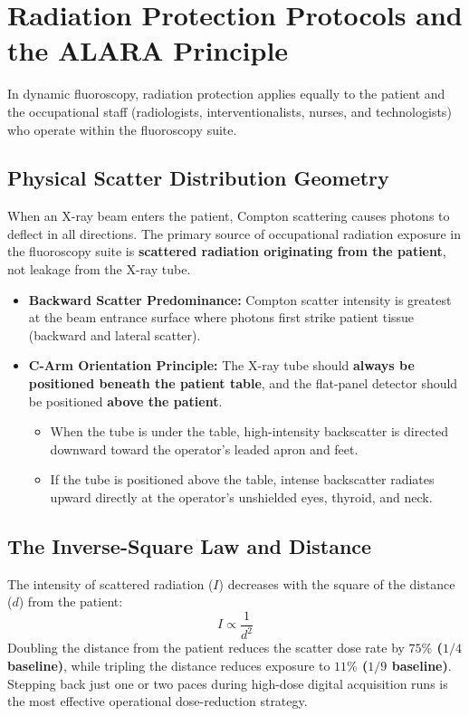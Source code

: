 \documentclass[11pt,a4paper]{article}
\begin{document}
\section{Radiation Protection Protocols and the ALARA Principle}

In dynamic fluoroscopy, radiation protection applies equally to the patient and the occupational staff (radiologists, interventionalists, nurses, and technologists) who operate within the fluoroscopy suite.

\subsection{Physical Scatter Distribution Geometry}

When an X-ray beam enters the patient, Compton scattering causes photons to deflect in all directions. The primary source of occupational radiation exposure in the fluoroscopy suite is \textbf{scattered radiation originating from the patient}, not leakage from the X-ray tube.

\begin{itemize}[leftmargin=*]
    \item \textbf{Backward Scatter Predominance:} Compton scatter intensity is greatest at the beam entrance surface where photons first strike patient tissue (backward and lateral scatter).
    \item \textbf{C-Arm Orientation Principle:} The X-ray tube should \textbf{always be positioned beneath the patient table}, and the flat-panel detector should be positioned \textbf{above the patient}.
    \begin{itemize}
        \item When the tube is under the table, high-intensity backscatter is directed downward toward the operator's leaded apron and feet.
        \item If the tube is positioned above the table, intense backscatter radiates upward directly at the operator's unshielded eyes, thyroid, and neck.
    \end{itemize}
\end{itemize}

\subsection{The Inverse-Square Law and Distance}

The intensity of scattered radiation ($I$) decreases with the square of the distance ($d$) from the patient:
\begin{equation}
    I \propto \frac{1}{d^2}
\end{equation}
Doubling the distance from the patient reduces the scatter dose rate by \textbf{$75\%$ ($1/4$ baseline)}, while tripling the distance reduces exposure to \textbf{$11\%$ ($1/9$ baseline)}. Stepping back just one or two paces during high-dose digital acquisition runs is the most effective operational dose-reduction strategy.
\end{document}

